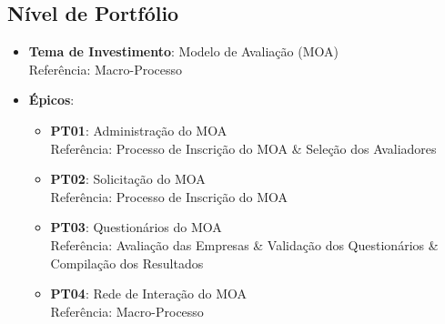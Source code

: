 \subsection[Nível de Portfólio]{Nível de Portfólio}
\label{subsec:requisitos_levantamento_portfolio}
	\begin{itemize}
		\item{\textbf{Tema de Investimento}: Modelo de Avaliação (MOA)
			\\ Referência: Macro-Processo \cite{moa}}
		\item{\textbf{Épicos}:
			\begin{itemize}
				\item{\textbf{PT01}: Administração do MOA
				\\ Referência: Processo de Inscrição do MOA \& Seleção dos Avaliadores}
				\item{\textbf{PT02}: Solicitação do MOA
				\\ Referência: Processo de Inscrição do MOA}
				\item{\textbf{PT03}: Questionários do MOA
				\\ Referência: Avaliação das Empresas \& Validação dos Questionários \& Compilação dos Resultados}
				\item{\textbf{PT04}: Rede de Interação do MOA
				\\ Referência: Macro-Processo}
			\end{itemize}}
	\end{itemize}

